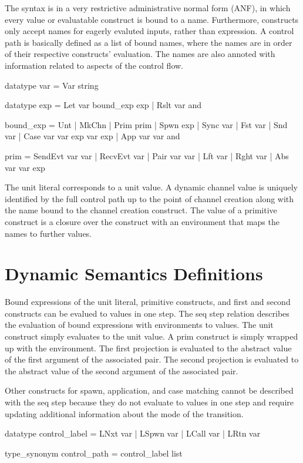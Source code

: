 The syntax is in a very restrictive administrative normal form (ANF), in which every value or
evaluatable construct is bound to a name.  Furthermore, constructs only accept names for
eagerly evaluted inputs, rather than expression.  A control path is basically defined as a list
of bound names, where the names are in order of their respective constructs' evaluation. The
names are also annoted with information related to aspects of the control flow. 


datatype var = Var string

datatype 
  exp = 
    Let var bound_exp exp |
    Rslt var and 

  bound_exp = 
    Unt | MkChn | Prim prim | Spwn exp |
    Sync var | Fst var | Snd var |
    Case var var exp var exp | App var var and 

  prim = 
    SendEvt var var | RecvEvt var | Pair var var |
    Lft var | Rght var | Abs var var exp


The unit literal corresponds to a unit value. A dynamic channel value is uniquely identified by
the full control path up to the point of channel creation along with the name bound to the
channel creation construct. The value of a primitive construct is a closure over the construct
with an environment that maps the names to further values.

\section{Dynamic Semantics Definitions}

Bound expressions of the unit literal, primitive constructs, and first and second constructs
can be evalued to values in one step. The seq step relation describes the evaluation of bound
expressions with environments to values. The unit construct simply evaluates to the unit
value.  A prim construct is simply wrapped up with the environment.  The first projection is
evaluated to the abstract value of the first argument of the associated pair. The second
projection is evaluated to the abstract value of the second argument of the associated pair.

Other constructs for spawn, application, and case matching cannot be described with the seq
step because they do not evaluate to values in one step and require updating additional
information about the mode of the transition. 

datatype control_label = 
  LNxt var | LSpwn var | LCall var | LRtn var

type_synonym control_path =
  control_label list

